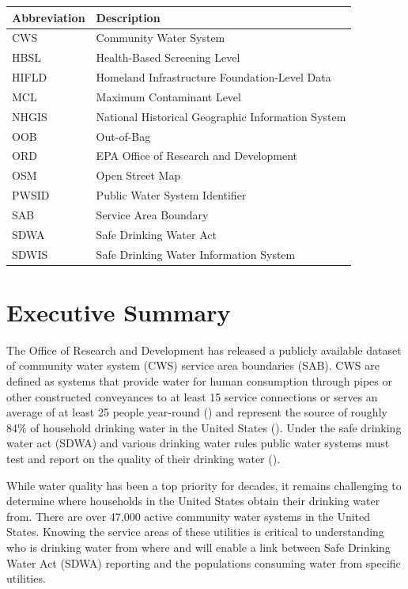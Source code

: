 \documentclass[12pt]{article}
\begin{document}
\begin{table}[ht]
\centering
\begin{tabular}{ll}
  \hline
 Abbreviation & Description \\ 
  \hline
CWS & Community Water System \\ 
  HBSL & Health-Based Screening Level \\ 
  HIFLD & Homeland Infrastructure Foundation-Level Data \\ 
  MCL & Maximum Contaminant Level \\ 
  NHGIS & National Historical Geographic Information System \\ 
  OOB & Out-of-Bag \\ 
  ORD & EPA Office of Research and Development \\ 
  OSM & Open Street Map \\ 
  PWSID & Public Water System Identifier \\ 
  SAB & Service Area Boundary \\ 
  SDWA & Safe Drinking Water Act \\ 
  SDWIS & Safe Drinking Water Information System \\ 
   \hline
\end{tabular}
\end{table}
\clearpage


\section{Executive Summary}\label{executive-summary}

The Office of Research and Development has released a publicly available
dataset of community water system (CWS) service area boundaries (SAB).
CWS are defined as systems that provide water for human consumption
through pipes or other constructed conveyances to at least 15 service
connections or serves an average of at least 25 people year-round
() and represent the source of roughly
84\% of household drinking water in the United States
(). Under the safe
drinking water act (SDWA) and various drinking water rules public water
systems must test and report on the quality of their drinking water
().

While water quality has been a top priority for decades, it remains
challenging to determine where households in the United States obtain
their drinking water from. There are over 47,000 active community water
systems in the United States. Knowing the service areas of these
utilities is critical to understanding who is drinking water from where
and will enable a link between Safe Drinking Water Act (SDWA) reporting
and the populations consuming water from specific utilities.
\end{document}
